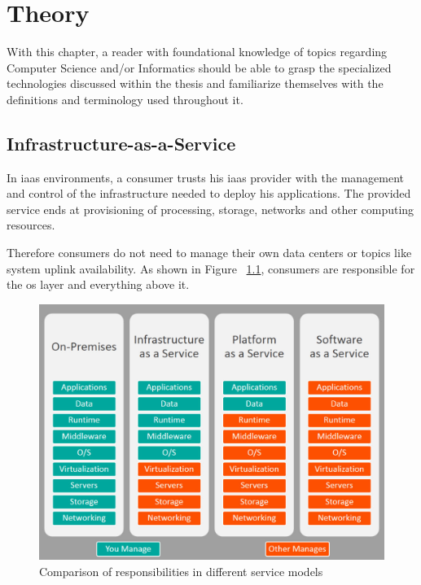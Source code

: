 \chapter{Theory}
With this chapter, a reader with foundational knowledge of topics regarding Computer Science and/or Informatics 
should be able to grasp the specialized technologies discussed within the thesis and familiarize themselves with the definitions and terminology used throughout it.
\section{Infrastructure-as-a-Service}
In \gls{iaas} environments, a consumer trusts his \gls{iaas} provider with the management and control of the infrastructure needed to deploy his applications.
The provided service ends at provisioning of processing, storage, networks and other computing resources.\footnotemark \\


Therefore consumers do not need to manage their own data centers or topics like system uplink availability.
As shown in Figure ~\ref{fig:servicecomparison}, consumers are responsible for the \gls{os} layer and everything above it.

\begin{figure}[H]
\includegraphics[scale=0.4]{pictures/ServiceComparison.jpg} 
\caption{Comparison of responsibilities in different service models\protect\footnotemark}
\label{fig:servicecomparison}
\end{figure}

